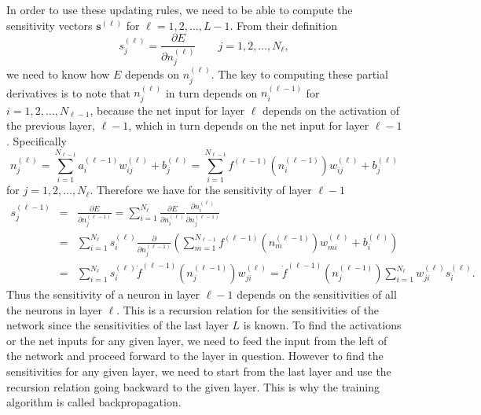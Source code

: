 \documentclass[fleqn]{article}
\begin{document}
In order to use these updating rules, we need to be able to compute the sensitivity vectors
$\mathbf s^{(\ell)}$ for $\ell = 1, 2, \ldots, L-1$.
From their definition
\[
s_{j}^{(\ell)} = \frac{\partial E}{\partial n_{j}^{(\ell)}} \qquad j=1, 2, \ldots, N_\ell,
\]
we need to know how $E$ depends on $n_{j}^{(\ell)}$.
The key to computing these partial derivatives is to note that
$n_{j}^{(\ell)}$ in turn depends on $n_{i}^{(\ell-1)}$ for $i=1, 2, \ldots, N_{\ell-1}$,
because the net input for layer $\ell$ depends on the activation of the previous layer, $\ell-1$,
which in turn depends on the net input for layer $\ell-1$.
Specifically
\[
n_j^{(\ell)} = \sum_{i=1}^{N_{\ell-1}} a_i^{(\ell-1)} w_{ij}^{(\ell)} + b_j^{(\ell)}
= \sum_{i=1}^{N_{\ell-1}} f^{(\ell-1)}(n_i^{(\ell-1)}) w_{ij}^{(\ell)} + b_j^{(\ell)}
\]
for $j=1, 2, \ldots, N_\ell$.
Therefore we have for the sensitivity of layer $\ell-1$
\begin{eqnarray*}
s_{j}^{(\ell-1)} &=& \frac{\partial E}{\partial n_{j}^{(\ell-1)}} =
\sum_{i=1}^{N_\ell} \frac{\partial E}{\partial n_{i}^{(\ell)}}
\frac{\partial n_{i}^{(\ell)}}{\partial n_{j}^{(\ell-1)}} \\
&=& \sum_{i=1}^{N_\ell} s_{i}^{(\ell)} \frac{\partial}{\partial n_{j}^{(\ell-1)}}
\left(
\sum_{m=1}^{N_{\ell-1}} f^{(\ell-1)}(n_m^{(\ell-1)}) w_{mi}^{(\ell)} + b_i^{(\ell)}
\right) \\
&=& \sum_{i=1}^{N_\ell} s_{i}^{(\ell)} \dot f^{(\ell-1)}(n_j^{(\ell-1)}) w_{ji}^{(\ell)}
= \dot f^{(\ell-1)}(n_j^{(\ell-1)}) \sum_{i=1}^{N_\ell} w_{ji}^{(\ell)} s_{i}^{(\ell)}.
\end{eqnarray*}
Thus the sensitivity of a neuron in layer $\ell-1$ depends on the sensitivities of all the neurons in layer $\ell$.
This is a recursion relation for the sensitivities of the network since the sensitivities of the last layer $L$ is known.
To find the activations or the net inputs for any given layer,
we need to feed the input from the left of the network and proceed forward to the layer in question.
However to find the sensitivities for any given layer,
we need to start from the last layer and use the recursion relation going backward to the given layer.
This is why the training algorithm is called backpropagation.
\end{document}
